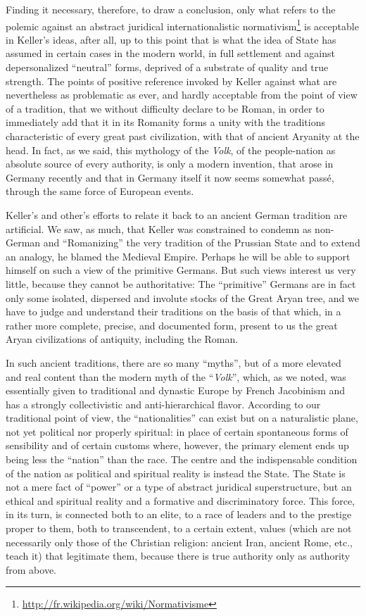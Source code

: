 Finding it necessary, therefore, to draw a conclusion, only what refers to the polemic against an abstract juridical internationalistic normativism\footnote{\url{http://fr.wikipedia.org/wiki/Normativisme}} is acceptable in Keller's ideas, after all, up to this point that is what the idea of State has assumed in certain cases in the modern world, in full settlement and against depersonalized ``neutral'' forms, deprived of a substrate of quality and true strength. The points of positive reference invoked by Keller against what are nevertheless as problematic as ever, and hardly acceptable from the point of view of a tradition, that we without difficulty declare to be Roman, in order to immediately add that it in its Romanity forms a unity with the traditions characteristic of every great past civilization, with that of ancient Aryanity at the head. In fact, as we said, this mythology of the \emph{Volk}, of the people-nation as absolute source of every authority, is only a modern invention, that arose in Germany recently and that in Germany itself it now seems somewhat passé, through the same force of European events.

Keller's and other's efforts to relate it back to an ancient German tradition are artificial. We saw, as much, that Keller was constrained to condemn as non-German and ``Romanizing'' the very tradition of the Prussian State and to extend an analogy, he blamed the Medieval Empire. Perhaps he will be able to support himself on such a view of the primitive Germans. But such views interest us very little, because they cannot be authoritative: The ``primitive'' Germans are in fact only some isolated, dispersed and involute stocks of the Great Aryan tree, and we have to judge and understand their traditions on the basis of that which, in a rather more complete, precise, and documented form, present to us the great Aryan civilizations of antiquity, including the Roman.

In such ancient traditions, there are so many ``myths'', but of a more elevated and real content than the modern myth of the ``\emph{Volk}'', which, as we noted, was essentially given to traditional and dynastic Europe by French Jacobinism and has a strongly collectivistic and anti-hierarchical flavor. According to our traditional point of view, the ``nationalities'' can exist but on a naturalistic plane, not yet political nor properly spiritual: in place of certain spontaneous forms of sensibility and of certain customs where, however, the primary element ends up being less the ``nation'' than the race. The centre and the indispensable condition of the nation as political and spiritual reality is instead the State. The State is not a mere fact of ``power'' or a type of abstract juridical superstructure, but an ethical and spiritual reality and a formative and discriminatory force. This force, in its turn, is connected both to an elite, to a race of leaders and to the prestige proper to them, both to transcendent, to a certain extent, values (which are not necessarily only those of the Christian religion: ancient Iran, ancient Rome, etc., teach it) that legitimate them, because there is true authority only as authority from above.

